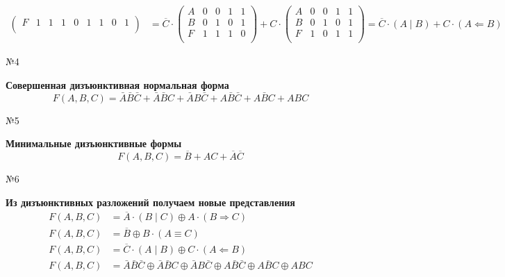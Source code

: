 \documentclass[]{article}
\begin{document}
\[\begin{aligned}
\begin{pmatrix}
	F&1&1&1&0&1&1&0&1\\
	\end{pmatrix}
	&=\overline{C}\cdot
	\begin{pmatrix}
	A&0&0&1&1\\
	B&0&1&0&1\\
	F&1&1&1&0\\
	\end{pmatrix}
	+C\cdot
	\begin{pmatrix}
	A&0&0&1&1\\
	B&0&1&0&1\\
	F&1&0&1&1\\
	\end{pmatrix}
	=\overline{C}\cdot (A\mid B)+C\cdot (A\Leftarrow B) 
\end{aligned}
	\]
	\begin{center}\begin{large}{№4}\end{large}\end{center}
	\textbf{Совершенная дизъюнктивная нормальная форма}
	\begin{equation}
	F(A,B,C)=\bar{A}\bar{B}\bar{C}+\bar{A}\bar{B}C+\bar{A}B\bar{C}+A\bar{B}\bar{C}+A\bar{B}C+ABC
	\end{equation}
	\begin{center}\begin{large}{№5}\end{large}\end{center}
	\textbf{Минимальные дизъюнктивные формы}
	\begin{equation}
	F(A,B,C)=\overline{B}+AC+\overline{A}\overline{C}
	\end{equation}
	\begin{center}\begin{large}{№6}\end{large}\end{center}
	
	\textbf{Из дизъюнктивных разложений получаем новые представления}
	\[
	\begin{aligned}
		F(A,B,C)&=\overline{A}\cdot (B\mid C)\oplus A\cdot (B\Rightarrow C) \\
		F(A,B,C)&=\overline{B}\oplus B\cdot (A\equiv C)\\
		F(A,B,C)&=\overline{C}\cdot (A\mid B)\oplus C\cdot (A\Leftarrow B) \\
		F(A,B,C)&=\bar{A}\bar{B}\bar{C}\oplus \bar{A}\bar{B}C\oplus\bar{A}B\bar{C}\oplus A\bar{B}\bar{C}\oplus A\bar{B}C\oplus ABC
	\end{aligned}
	\]
	
\end{document}
